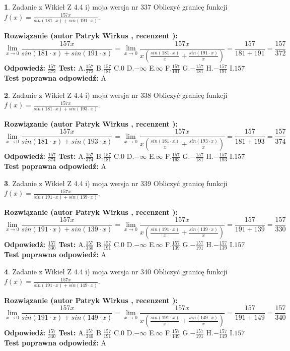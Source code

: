 \documentclass[12pt, a4paper]{article}
\theoremstyle{definition} %
\newtheorem{zad}{}
\newcommand{\zadStart}[1]{\begin{zad}#1\newline}
\newcommand{\zadStop}{\end{zad}}
\newcommand{\rozwStart}[2]{\noindent \textbf{Rozwiązanie (autor #1 , recenzent #2): }\newline}
\newcommand{\rozwStop}{\newline}
\newcommand{\odpStart}{\noindent \textbf{Odpowiedź:}\newline}
\newcommand{\odpStop}{\newline}
\newcommand{\testStart}{\noindent \textbf{Test:}\newline}
\newcommand{\testStop}{\newline}
\newcommand{\kluczStart}{\noindent \textbf{Test poprawna odpowiedź:}\newline}
\newcommand{\kluczStop}{\newline}
\begin{document}
\zadStart{Zadanie z Wikieł Z 4.4 i) moja wersja nr 337}
Obliczyć granicę funkcji $f(x)=\frac{157x}{sin(181\cdot x) +sin(191\cdot x)}$.
\zadStop
\rozwStart{Patryk Wirkus}{}
$$\lim\limits_{x\to 0}\frac{157x}{sin(181\cdot x) +sin(191\cdot x)}=\lim\limits_{x\to 0}\frac{157x}{x(\frac{sin(181\cdot x)}{x}+\frac{sin(191\cdot x)}{x})}=\frac{157}{181+191} = \frac{157}{372}$$
\rozwStop
\odpStart
$\frac{157}{372}$
\odpStop
\testStart
A.$\frac{157}{372}$
B.$\frac{157}{181}$
C.$0$
D.$-\infty$
E.$\infty$
F.$\frac{157}{191}$
G.$-\frac{157}{181}$
H.$-\frac{157}{191}$
I.$157$
\testStop
\kluczStart
A
\kluczStop



\zadStart{Zadanie z Wikieł Z 4.4 i) moja wersja nr 338}
Obliczyć granicę funkcji $f(x)=\frac{157x}{sin(181\cdot x) +sin(193\cdot x)}$.
\zadStop
\rozwStart{Patryk Wirkus}{}
$$\lim\limits_{x\to 0}\frac{157x}{sin(181\cdot x) +sin(193\cdot x)}=\lim\limits_{x\to 0}\frac{157x}{x(\frac{sin(181\cdot x)}{x}+\frac{sin(193\cdot x)}{x})}=\frac{157}{181+193} = \frac{157}{374}$$
\rozwStop
\odpStart
$\frac{157}{374}$
\odpStop
\testStart
A.$\frac{157}{374}$
B.$\frac{157}{181}$
C.$0$
D.$-\infty$
E.$\infty$
F.$\frac{157}{193}$
G.$-\frac{157}{181}$
H.$-\frac{157}{193}$
I.$157$
\testStop
\kluczStart
A
\kluczStop



\zadStart{Zadanie z Wikieł Z 4.4 i) moja wersja nr 339}
Obliczyć granicę funkcji $f(x)=\frac{157x}{sin(191\cdot x) +sin(139\cdot x)}$.
\zadStop
\rozwStart{Patryk Wirkus}{}
$$\lim\limits_{x\to 0}\frac{157x}{sin(191\cdot x) +sin(139\cdot x)}=\lim\limits_{x\to 0}\frac{157x}{x(\frac{sin(191\cdot x)}{x}+\frac{sin(139\cdot x)}{x})}=\frac{157}{191+139} = \frac{157}{330}$$
\rozwStop
\odpStart
$\frac{157}{330}$
\odpStop
\testStart
A.$\frac{157}{330}$
B.$\frac{157}{191}$
C.$0$
D.$-\infty$
E.$\infty$
F.$\frac{157}{139}$
G.$-\frac{157}{191}$
H.$-\frac{157}{139}$
I.$157$
\testStop
\kluczStart
A
\kluczStop



\zadStart{Zadanie z Wikieł Z 4.4 i) moja wersja nr 340}
Obliczyć granicę funkcji $f(x)=\frac{157x}{sin(191\cdot x) +sin(149\cdot x)}$.
\zadStop
\rozwStart{Patryk Wirkus}{}
$$\lim\limits_{x\to 0}\frac{157x}{sin(191\cdot x) +sin(149\cdot x)}=\lim\limits_{x\to 0}\frac{157x}{x(\frac{sin(191\cdot x)}{x}+\frac{sin(149\cdot x)}{x})}=\frac{157}{191+149} = \frac{157}{340}$$
\rozwStop
\odpStart
$\frac{157}{340}$
\odpStop
\testStart
A.$\frac{157}{340}$
B.$\frac{157}{191}$
C.$0$
D.$-\infty$
E.$\infty$
F.$\frac{157}{149}$
G.$-\frac{157}{191}$
H.$-\frac{157}{149}$
I.$157$
\testStop
\kluczStart
A
\kluczStop
\end{document}
